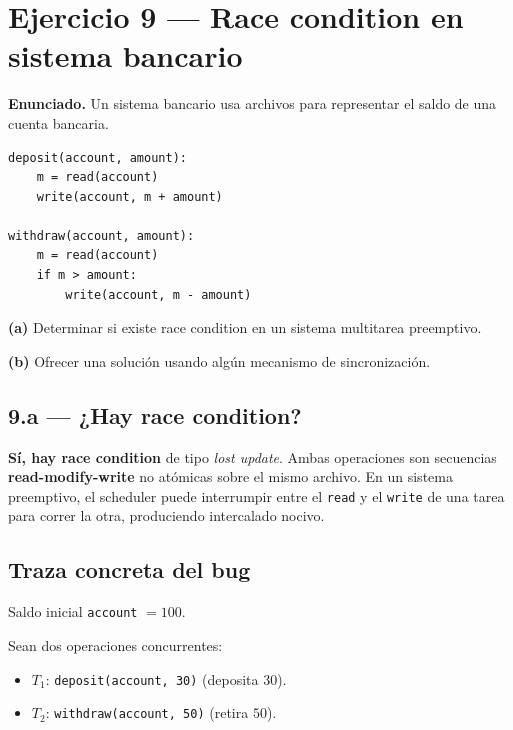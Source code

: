 \documentclass[11pt,a4paper]{article}
\begin{document}
\section{Ejercicio 9 --- Race condition en sistema bancario}

\textbf{Enunciado.} Un sistema bancario usa archivos para representar
el saldo de una cuenta bancaria.

\begin{lstlisting}[style=cstyle]
deposit(account, amount):
    m = read(account)
    write(account, m + amount)

withdraw(account, amount):
    m = read(account)
    if m > amount:
        write(account, m - amount)
\end{lstlisting}

\textbf{(a)} Determinar si existe race condition en un sistema
multitarea preemptivo.

\textbf{(b)} Ofrecer una solución usando algún mecanismo de
sincronización.

\subsection*{9.a --- ¿Hay race condition?}

\begin{respuesta}
\textbf{Sí, hay race condition} de tipo \emph{lost update}. Ambas
operaciones son secuencias \textbf{read-modify-write} no atómicas
sobre el mismo archivo. En un sistema preemptivo, el scheduler
puede interrumpir entre el \texttt{read} y el \texttt{write} de
una tarea para correr la otra, produciendo intercalado nocivo.
\end{respuesta}

\subsection*{Traza concreta del bug}

Saldo inicial \texttt{account} $= 100$.

Sean dos operaciones concurrentes:
\begin{itemize}[leftmargin=*,nosep]
    \item $T_1$: \texttt{deposit(account, 30)} (deposita $30$).
    \item $T_2$: \texttt{withdraw(account, 50)} (retira $50$).
\end{itemize}
\end{document}
